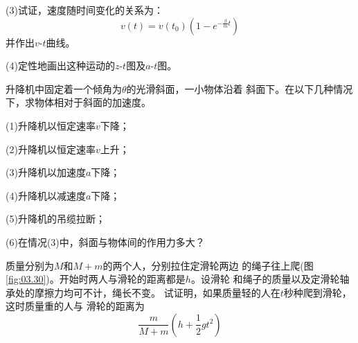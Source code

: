 \begin{exercises}
(3)试证，速度随时间变化的关系为：
\begin{equation*}
    v ( t ) = v ( t _ 0 ) \left( 1 - e ^ { - \frac { \beta } { m } t } \right)
\end{equation*}
并作出$ v\mbox{-}t $曲线。

(4)定性地画出这种运动的$ z\mbox{-}t $图及$ a\mbox{-}t $图。

\exercise 升降机中固定着一个倾角为$ \theta $的光滑斜面，一小物体沿着
斜面下。在以下几种情况下，求物体相对于斜面的加速度。

(1)升降机以恒定速率$ v $下降；

(2)升降机以恒定速率$ v $上升；

(3)升降机以加速度$ a $下降；

(4)升降机以减速度$ a $下降；

(5)升降机的吊缆拉断；

(6)在情况(3)中，斜面与物体间的作用力多大？

\exercise 质量分别为$ M $和$  M + m  $的两个人，分别拉住定滑轮两边
的绳子往上爬(图\ref{fig:03.30})。开始时两人与滑轮的距离都是$ h $。设滑轮
和绳子的质量以及定滑轮轴承处的摩擦力均可不计，绳长不变。
试证明，如果质量轻的人在$ t $秒种爬到滑轮，这时质量重的人与
滑轮的距离为
\begin{equation*}
	\frac { m } { M + m } \left( h + \frac { 1 } { 2 } g t ^ { 2 } \right)
\end{equation*}


\end{exercises}

